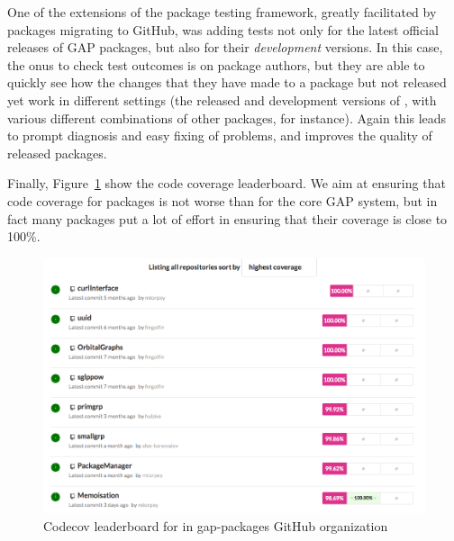 One of the extensions of the package testing framework, greatly 
facilitated by packages migrating to GitHub, was adding tests not
only for the latest official releases of GAP packages, but also
for their \emph{development} versions.
In this case, the onus to check test outcomes is on package authors,
but they are able to quickly see how the changes that they have made to
a package but not released yet work in different settings (the
released and development versions of \GAP, with various different
combinations of other packages, for instance). Again this leads to
prompt diagnosis and easy fixing of problems, and improves the quality
of released packages.



Finally, Figure~\ref{fig:gap-packages-codecov} show the code coverage
leaderboard. We aim at ensuring that code coverage for packages is 
not worse than for the core GAP system, but in fact many packages
put a lot of effort in ensuring that their coverage is close to 100\%. 

\begin{figure}[!ht]
    \centering
    \includegraphics[width=\textwidth]{images/gap-packages-codecov}
    \caption{Codecov leaderboard for in gap-packages GitHub organization}
    \label{fig:gap-packages-codecov}
\end{figure}


